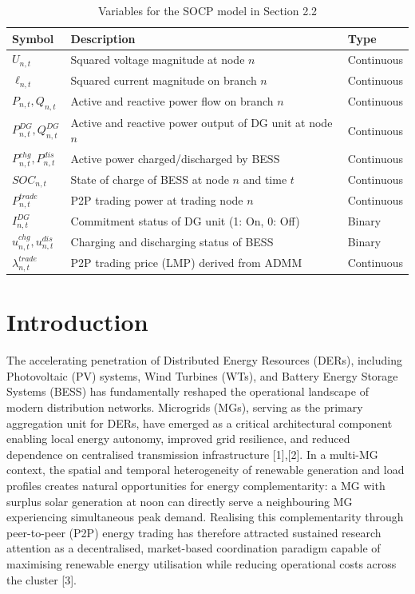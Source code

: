 \documentclass[preprint,12pt]{elsarticle}
\begin{document}
\begin{table}[htbp]
\centering
\caption{Variables for the SOCP model in Section 2.2}
\label{tab:variables_socp}
\begin{tabularx}{\textwidth}{@{}l X l@{}}
\toprule
\textbf{Symbol} & \textbf{Description} & \textbf{Type} \\ \midrule
$U_{n,t}$ & Squared voltage magnitude at node $n$ & Continuous \\
$\ell_{n,t}$ & Squared current magnitude on branch $n$ & Continuous \\
$P_{n,t}, Q_{n,t}$ & Active and reactive power flow on branch $n$ & Continuous \\
$P_{n,t}^{DG}, Q_{n,t}^{DG}$ & Active and reactive power output of DG unit at node $n$ & Continuous \\
$P_{n,t}^{chg}, P_{n,t}^{dis}$ & Active power charged/discharged by BESS & Continuous \\
$SOC_{n,t}$ & State of charge of BESS at node $n$ and time $t$ & Continuous \\
$P_{n,t}^{trade}$ & P2P trading power at trading node $n$ & Continuous \\
$I_{n,t}^{DG}$ & Commitment status of DG unit (1: On, 0: Off) & Binary \\
$u_{n,t}^{chg}, u_{n,t}^{dis}$ & Charging and discharging status of BESS & Binary \\
$\lambda_{n,t}^{trade}$ & P2P trading price (LMP) derived from ADMM & Continuous \\ \bottomrule
\end{tabularx}
\end{table}



\section{Introduction}
The accelerating penetration of Distributed Energy Resources (DERs), including Photovoltaic (PV) systems, Wind Turbines (WTs), and Battery Energy Storage Systems (BESS) has fundamentally reshaped the operational landscape of modern distribution networks. Microgrids (MGs), serving as the primary aggregation unit for DERs, have emerged as a critical architectural component enabling local energy autonomy, improved grid resilience, and reduced dependence on centralised transmission infrastructure [1],[2]. In a multi-MG context, the spatial and temporal heterogeneity of renewable generation and load profiles creates natural opportunities for energy complementarity: a MG with surplus solar generation at noon can directly serve a neighbouring MG experiencing simultaneous peak demand. Realising this complementarity through peer-to-peer (P2P) energy trading has therefore attracted sustained research attention as a decentralised, market-based coordination paradigm capable of maximising renewable energy utilisation while reducing operational costs across the cluster [3].
\end{document}
